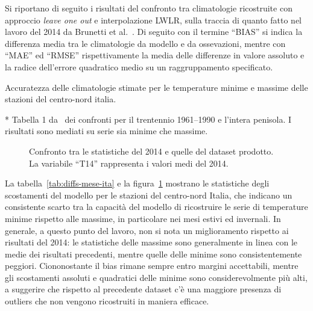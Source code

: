 Si riportano di seguito i risultati del confronto tra climatologie ricostruite con approccio \emph{leave one out} e interpolazione LWLR, sulla traccia di quanto fatto nel lavoro del 2014 da Brunetti et al.~\cite{brunettiHighresolutionTemperatureClimatology2014}. Di seguito con il termine ``BIAS'' si indica la differenza media tra le climatologie da modello e da ossevazioni, mentre con ``MAE'' ed ``RMSE'' rispettivamente la media delle differenze in valore assoluto e la radice dell'errore quadratico medio su un raggruppamento specificato.

\begin{table}[ht]
  \centering
  \begin{adjustbox}{max width=\textwidth}
    \begin{threeparttable}
      \caption{Accuratezza delle climatologie stimate per le temperature minime e massime delle stazioni del centro-nord italia.}\label{tab:diffs-mese-ita}
      
      \begin{tablenotes}
      \item[*] Tabella 1 da~\cite[p.~10]{brunettiHighresolutionTemperatureClimatology2014} dei confronti per il trentennio 1961--1990 e l'intera penisola. I risultati sono mediati su serie sia minime che massime.
      \end{tablenotes}
    \end{threeparttable}
  \end{adjustbox}
\end{table}

\begin{figure}[ht]
  \centering
  
  \caption{Confronto tra le statistiche del 2014 e quelle del dataset prodotto. La variabile ``T14'' rappresenta i valori medi del 2014.}\label{fig:diffs-mese-ita}
\end{figure}
La tabella~\ref{tab:diffs-mese-ita} e la figura~\ref{fig:diffs-mese-ita} mostrano le statistiche degli scostamenti del modello per le stazioni del centro-nord Italia, che indicano un consistente scarto tra la capacità del modello di ricostruire le serie di temperature minime rispetto alle massime, in particolare nei mesi estivi ed invernali. In generale, a questo punto del lavoro, non si nota un miglioramento rispetto ai risultati del 2014: le statistiche delle massime sono generalmente in linea con le medie dei risultati precedenti, mentre quelle delle minime sono consistentemente peggiori. Ciononostante il bias rimane sempre entro margini accettabili, mentre gli scostamenti assoluti e quadratici delle minime sono considerevolmente più alti, a suggerire che rispetto al precedente dataset c'è una maggiore presenza di outliers che non vengono ricostruiti in maniera efficace.

